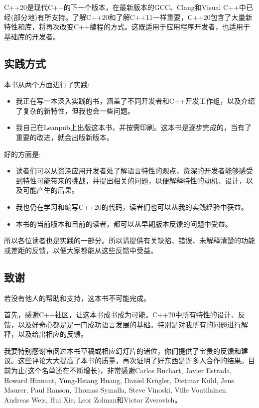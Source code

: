 
C++20是现代C++的下一个版本，在最新版本的GCC、Clang和Visual C++中已经(部分地)有所支持。了解C++20和了解C++11一样重要，C++20包含了大量新特性和库，将再次改变C++编程的方式。这既适用于应用程序开发者，也适用于基础库的开发者。

\subsection*{实践方式}

本书从两个方面进行了实践:

\begin{itemize}
\item
我正在写一本深入实践的书，涵盖了不同开发者和C++开发工作组，以及介绍了复杂的新特性，但我也会一些问题。

\item
我自己在Leanpub上出版这本书，并按需印刷。这本书是逐步完成的，当有了重要的改进，就会出版新版本。
\end{itemize}

好的方面是:

\begin{itemize}
\item
读者们可以从资深应用开发者处了解语言特性的观点，资深的开发者能够感受到特性可能带来的挑战，并提出相关的问题，以便解释特性的动机、设计，以及可能产生的后果。

\item
我也仍在学习和编写C++20的代码，读者们也可以从我的实践经验中获益。

\item
本书的当前版本和目前的读者，都可以从早期版本反馈的问题中受益。
\end{itemize}

所以各位读者也是实践的一部分。所以请提供有关缺陷、错误、未解释清楚的功能或差距的反馈，以便大家都能从这些反馈中受益。

\subsection*{致谢}

若没有他人的帮助和支持，这本书不可能完成。

首先，感谢C++社区，让这本书成书成为可能。C++20中所有特性的设计、反馈，以及好奇心都是是一门成功语言发展的基础。特别是对我所有的问题进行解释，以及给出相应的反馈。

我要特别感谢审阅过本书草稿或相应幻灯片的诸位，你们提供了宝贵的反馈和建议。这些评论大大提高了本书的质量，再次证明了好东西是许多人合作的结果。目前为止(这个名单还在不断增长)，非常感谢Carlos Buchart, Javier Estrada, Howard Hinnant, Yung-Hsiang Huang, Daniel Kr{\"u}gler, Dietmar K{\"u}hl, Jens Maurer, Paul Ranson, Thomas Symalla, Steve Vinoski, Ville Voutilainen. Andreas Weis, Hui Xie, Leor Zolman和Victor Zverovich。

